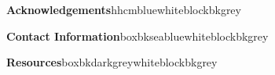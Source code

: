 \documentclass{beamer}
\begin{document}
\begin{frame}[t]
\begin{columns}[T]
\begin{column}{.46\textwidth}
				\begin{customblock}{\textbf{Acknowledgements}}{hhcmblue}{white}{blockbkgrey}
					
				\end{customblock}
			
%					
%			
				\begin{customblock}{\textbf{Contact Information}}{boxbkseablue}{white}{blockbkgrey}
					
				\end{customblock}
				
				\begin{customblock}{\textbf{Resources}}{boxbkdarkgrey}{white}{blockbkgrey}
					
				\end{customblock}
			
			\end{column}
			
		\end{columns}

	\end{frame}
\end{document}

